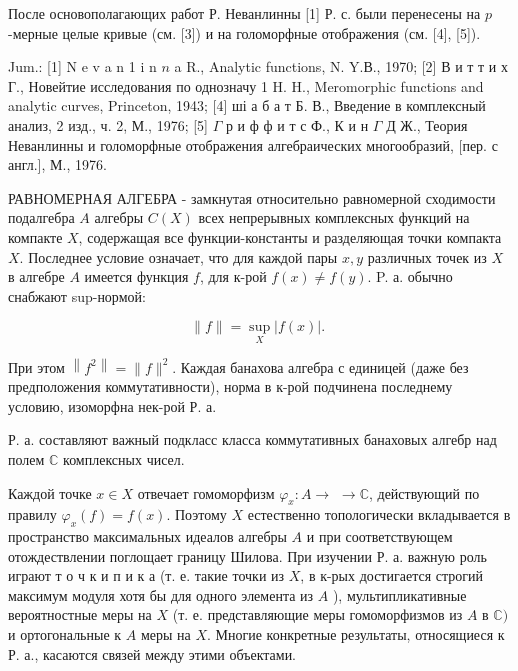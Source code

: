 \documentclass[10pt]{article}
\begin{document}
После основополагающих работ Р. Неванлинны [1] Р. с. были перенесены на $p$-мерные целые кривые (см. [3]) и на голоморфные отображения (см. [4], [5]).



Jum.: [1] N e v a n 1 i n $n$ a R., Analytic functions, N. Y.В., 1970; [2] В и т т и х Г., Новейтие исследования по однозначу 1 H. H., Meromorphic functions and analytic curves, Princeton, 1943; [4] ші а б а т Б. В., Введение в комплексный анализ, 2 изд., ч. 2, М., 1976; [5] $\Gamma$ р и ф ф и т с Ф., К и н $\Gamma$ Д Ж., Теория Неванлинны и голоморфные отображения алгебраических многообразий, [пер. с англ.], М., 1976.



РАВНОМЕРНАЯ АЛГЕБРА - замкнутая относительно равномерной сходимости подалгебра $A$ алгебры $C(X)$ всех непрерывных комплексных функций на компакте $X$, содержащая все функции-константы и разделяющая точки компакта $X$. Последнее условие означает, что для каждой пары $x, y$ различных точек из $X$ в алгебре $A$ имеется функция $f$, для к-рой $f(x) \neq f(y)$. P. а. обычно снабжают sup-нормой:



\[

\|f\|=\sup _{X}|f(x)| \text {. }

\]



При этом $\left\|f^{2}\right\|=\|f\|^{2}$. Каждая банахова алгебра с единицей (даже без предположения коммутативности), норма в к-рой подчинена последнему условию, изоморфна нек-рой Р. а.



Р. а. составляют важный подкласс класса коммутативных банаховых алгебр над полем $\mathbb{C}$ комплексных чисел.



Каждой точке $x \in X$ отвечает гомоморфизм $\varphi_{x}: A \rightarrow$ $\rightarrow \mathbb{C}$, действующий по правилу $\varphi_{x}(f)=f(x)$. Поэтому $X$ естественно топологически вкладывается в пространство максимальных идеалов алгебры $A$ и при соответствующем отождествлении поглощает границу Шилова. При изучении Р. а. важную роль играют т о ч к и п и к а (т. е. такие точки из $X$, в к-рых достигается строгий максимум модуля хотя бы для одного элемента из $A$ ), мультипликативные вероятностные меры на $X$ (т. е. представляющие меры гомоморфизмов из $A$ в $\mathbb{C})$ и ортогональные к $A$ меры на $X$. Многие конкретные результаты, относящиеся к Р. а., касаются связей между этими объектами.
\end{document}
